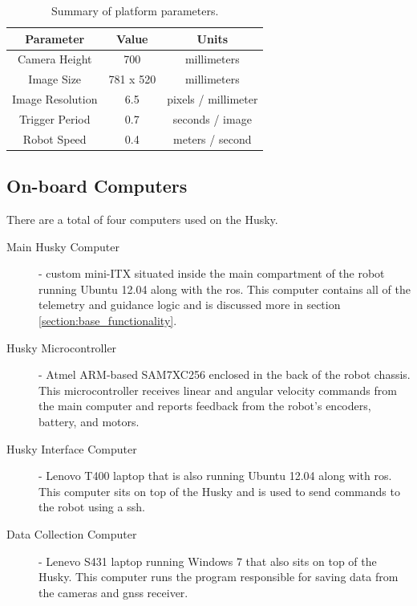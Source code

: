 \begin{table}
    \begin{center}
    \caption{Summary of platform parameters.}
    \begin{tabular}[c]{|c|c|c|}
        \hline
        Parameter & Value & Units \\
        \hline
        Camera Height    & 700       & millimeters         \\
        Image Size       & 781 x 520 & millimeters         \\
        Image Resolution & 6.5       & pixels / millimeter \\
        Trigger Period   & 0.7       & seconds / image     \\
        Robot Speed      & 0.4       & meters / second     \\
        \hline
    \end{tabular}
    \label{table:platform_params}
   \end{center}
\end{table}

\subsection{On-board Computers}

There are a total of four computers used on the Husky.

\begin{description}
\item[Main Husky Computer] - custom mini-ITX situated inside the main compartment of the robot running Ubuntu 12.04 along with the \ac{ros}. This computer contains all of the telemetry and guidance logic and is discussed more in section \ref{section:base_functionality}.  
\item[Husky Microcontroller] - Atmel ARM-based SAM7XC256 enclosed in the back of the robot chassis.  This microcontroller receives linear and angular velocity commands from the main computer and reports feedback from the robot's encoders, battery, and motors. 
\item[Husky Interface Computer] - Lenovo T400 laptop that is also running Ubuntu 12.04 along with \ac{ros}.  This computer sits on top of the Husky and is used to send commands to the robot using a \ac{ssh}.
\item[Data Collection Computer] - Lenevo S431 laptop running Windows 7 that also sits on top of the Husky.  This computer runs the program responsible for saving data from the cameras and \ac{gnss} receiver.   
\end{description}

